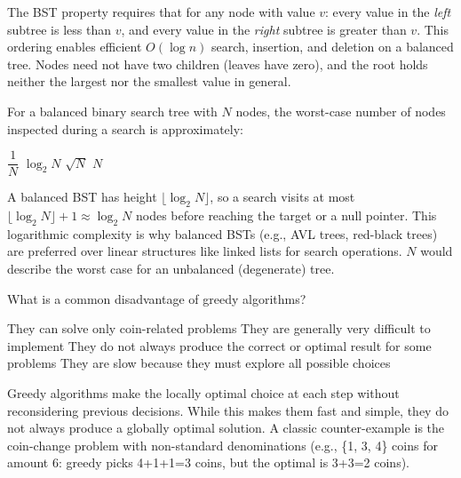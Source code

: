 \documentclass[answers]{exam}
\begin{document}
\begin{questions}
\begin{solution}
    The BST property requires that for any node with value $v$: every value in the \textit{left} subtree is less than $v$, and every value in the \textit{right} subtree is greater than $v$.
    This ordering enables efficient $O(\log n)$ search, insertion, and deletion on a balanced tree.
    Nodes need not have two children (leaves have zero), and the root holds neither the largest nor the smallest value in general.
\end{solution}

\question For a balanced binary search tree with $N$ nodes, the worst-case number of nodes inspected during a search is approximately:

\begin{oneparchoices}
    \choice $\dfrac{1}{N}$
    \correctchoice $\log_2 N$
    \choice $\sqrt{N}$
    \choice $N$
\end{oneparchoices}

\begin{solution}
    A balanced BST has height $\lfloor \log_2 N \rfloor$, so a search visits at most $\lfloor \log_2 N \rfloor + 1 \approx \log_2 N$ nodes before reaching the target or a null pointer.
    This logarithmic complexity is why balanced BSTs (e.g., AVL trees, red-black trees) are preferred over linear structures like linked lists for search operations.
    $N$ would describe the worst case for an unbalanced (degenerate) tree.
\end{solution}

\question What is a common disadvantage of greedy algorithms?

\begin{choices}
    \choice They can solve only coin-related problems
    \choice They are generally very difficult to implement
    \correctchoice They do not always produce the correct or optimal result for some problems
    \choice They are slow because they must explore all possible choices
\end{choices}

\begin{solution}
    Greedy algorithms make the locally optimal choice at each step without reconsidering previous decisions.
    While this makes them fast and simple, they do not always produce a globally optimal solution.
    A classic counter-example is the coin-change problem with non-standard denominations (e.g., \{1, 3, 4\} coins for amount 6: greedy picks 4+1+1=3 coins, but the optimal is 3+3=2 coins).
\end{solution}


\end{questions}
\end{document}
